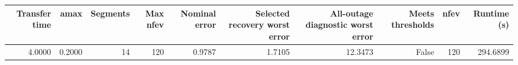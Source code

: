 \begin{tabular}{rrrrrrrrrr}
\toprule
Transfer time & amax & Segments & Max nfev & Nominal error & Selected recovery worst error & All-outage diagnostic worst error & Meets thresholds & nfev & Runtime (s) \\
\midrule
4.0000 & 0.2000 & 14 & 120 & 0.9787 & 1.7105 & 12.3473 & False & 120 & 294.6899 \\
\bottomrule
\end{tabular}
